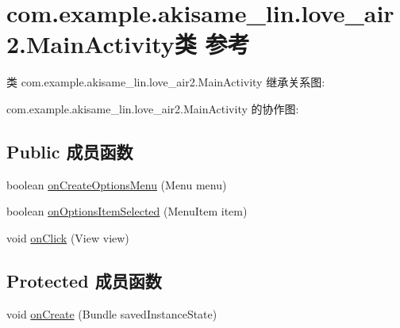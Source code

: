\hypertarget{classcom_1_1example_1_1akisame__lin_1_1love__air2_1_1_main_activity}{}\section{com.\+example.\+akisame\+\_\+lin.\+love\+\_\+air2.\+Main\+Activity类 参考}
\label{classcom_1_1example_1_1akisame__lin_1_1love__air2_1_1_main_activity}


类 com.\+example.\+akisame\+\_\+lin.\+love\+\_\+air2.\+Main\+Activity 继承关系图\+:


com.\+example.\+akisame\+\_\+lin.\+love\+\_\+air2.\+Main\+Activity 的协作图\+:
\subsection*{Public 成员函数}
\begin{DoxyCompactItemize}
\item 
boolean \mbox{\hyperlink{classcom_1_1example_1_1akisame__lin_1_1love__air2_1_1_main_activity_a7688b188a3dfa57ea57110b66e730291}{on\+Create\+Options\+Menu}} (Menu menu)
\item 
boolean \mbox{\hyperlink{classcom_1_1example_1_1akisame__lin_1_1love__air2_1_1_main_activity_af5e7d5796baa70f1ae49937da6a3ccef}{on\+Options\+Item\+Selected}} (Menu\+Item item)
\item 
void \mbox{\hyperlink{classcom_1_1example_1_1akisame__lin_1_1love__air2_1_1_main_activity_a66b33f5623bf66ccfd31c9cd3893cd8e}{on\+Click}} (View view)
\end{DoxyCompactItemize}
\subsection*{Protected 成员函数}
\begin{DoxyCompactItemize}
\item 
void \mbox{\hyperlink{classcom_1_1example_1_1akisame__lin_1_1love__air2_1_1_main_activity_a1338fd61cb5d42c59c698553117af4ac}{on\+Create}} (Bundle saved\+Instance\+State)
\end{DoxyCompactItemize}
